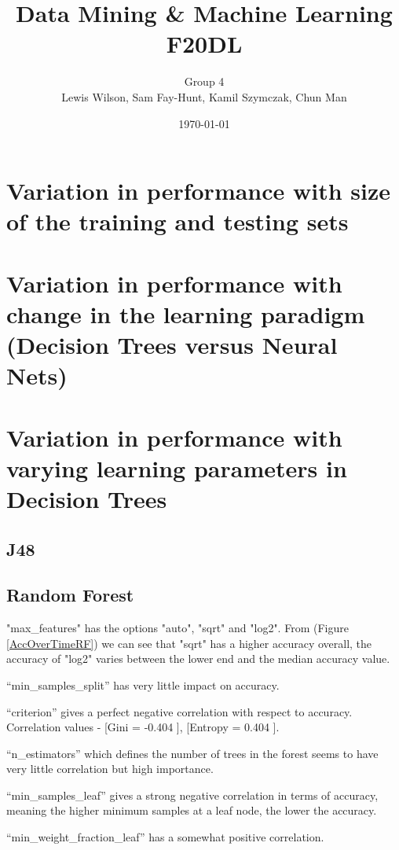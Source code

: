 \documentclass[11pt]{article}
\begin{document}
\title{\huge Data Mining \& Machine Learning F20DL} 
\author{Group 4\\Lewis Wilson, Sam Fay-Hunt, Kamil Szymczak, Chun Man }
\date{\today}
\maketitle

\newpage
\tableofcontents
\thispagestyle{empty}
\pagebreak
\setcounter{page}{1}

\newpage
\section{Variation in performance with size of the training and testing sets}

\newpage
\section{Variation in performance with change in the learning paradigm (Decision Trees versus
Neural Nets)}

\newpage
\section{Variation in performance with varying learning parameters in Decision Trees}

\subsection{J48}



\newpage
\subsection{Random Forest}

"max\_features" has the options "auto", "sqrt" and "log2". From (Figure \ref{AccOverTimeRF}) we can see that "sqrt" has a higher accuracy overall, the accuracy of "log2" varies between the lower end and the median accuracy value.
\par
“min\_samples\_split” has very little impact on accuracy.
\par
“criterion” gives a perfect negative correlation with respect to accuracy. Correlation values -  [Gini = -0.404 ], [Entropy = 0.404 ].
\par
“n\_estimators” which defines the number of trees in the forest seems to have very little correlation but high importance.
\par
“min\_samples\_leaf” gives a strong negative correlation in terms of accuracy, meaning the higher minimum samples at a leaf node, the lower the accuracy.
\par
“min\_weight\_fraction\_leaf” has a somewhat positive correlation.
\end{document}

